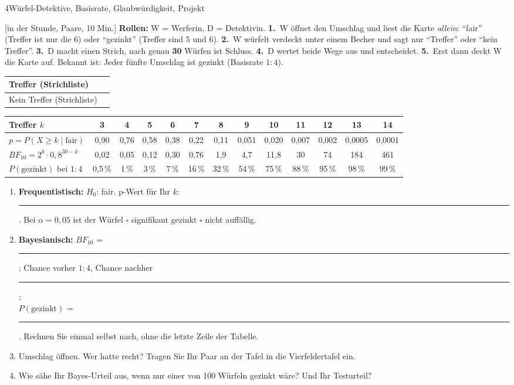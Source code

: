 \begin{uebungsblattb}{4}{Würfel-Detektive, Basisrate, Glaubwürdigkeit, Projekt}

[in der Stunde, Paare, 10 Min.]
\textbf{Rollen:} W = Werferin, D = Detektivin. \textbf{1.}~W öffnet den
Umschlag und liest die Karte \emph{allein}: \enquote{fair} (Treffer ist nur
die 6) oder \enquote{gezinkt} (Treffer sind 5 und 6). \textbf{2.}~W würfelt
verdeckt unter einem Becher und sagt nur \enquote{Treffer} oder
\enquote{kein Treffer}. \textbf{3.}~D macht einen Strich, nach genau
\textbf{30} Würfen ist Schluss. \textbf{4.}~D wertet beide Wege aus und
entscheidet. \textbf{5.}~Erst dann deckt W die Karte auf. Bekannt ist:
Jeder fünfte Umschlag ist gezinkt (Basisrate $1:4$).

\begin{center}
\renewcommand{\arraystretch}{1.6}
\begin{tabular}{|p{}|p{}|}
\hline
Treffer (Strichliste) & \\ \hline
Kein Treffer (Strichliste) & \\ \hline
\end{tabular}
\end{center}

\begin{center}
\footnotesize
\setlength{\tabcolsep}{3.5pt}
\begin{tabular}{@{}l*{12}{c}@{}}
\toprule
Treffer $k$ & 3 & 4 & 5 & 6 & 7 & 8 & 9 & 10 & 11 & 12 & 13 & 14 \\
\midrule
$p=P(X\geq k\mid\text{fair})$ & 0,90 & 0,76 & 0,58 & 0,38 & 0,22 & 0,11 & 0,051 & 0,020 & 0,007 & 0,002 & 0,0005 & 0,0001 \\
$\mathit{BF}_{10}=2^k\cdot0{,}8^{30-k}$ & 0,02 & 0,05 & 0,12 & 0,30 & 0,76 & 1,9 & 4,7 & 11,8 & 30 & 74 & 184 & 461 \\
$P(\text{gezinkt})$ bei $1:4$ & 0,5\,\% & 1\,\% & 3\,\% & 7\,\% & 16\,\% & 32\,\% & 54\,\% & 75\,\% & 88\,\% & 95\,\% & 98\,\% & 99\,\% \\
\bottomrule
\end{tabular}
\end{center}

\begin{enumerate}
  \item \textbf{Frequentistisch:} $H_0$: fair. p-Wert für Ihr $k$:
    \rule{20mm}{0.3pt}. Bei $\alpha=0{,}05$ ist der Würfel
    \quad $\square$ signifikant gezinkt \quad $\square$ nicht auffällig.
  \item \textbf{Bayesianisch:} $\mathit{BF}_{10}$ = \rule{18mm}{0.3pt};
    Chance vorher $1:4$, Chance nachher \rule{18mm}{0.3pt};\\
    $P(\text{gezinkt})$ = \rule{18mm}{0.3pt}. Rechnen Sie einmal selbst
    nach, ohne die letzte Zeile der Tabelle.
  \item Umschlag öffnen. Wer hatte recht? Tragen Sie Ihr Paar an der Tafel
    in die Vierfeldertafel ein.
  \item Wie sähe Ihr Bayes-Urteil aus, wenn nur einer von 100 Würfeln
    gezinkt wäre? Und Ihr Testurteil?
\end{enumerate}



\end{uebungsblattb}
